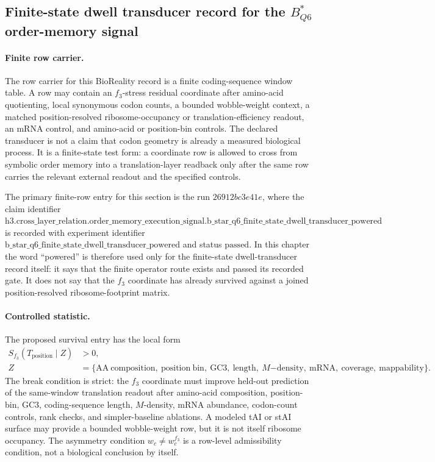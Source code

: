 \subsection{Finite-state dwell transducer record for the $B^*_{Q6}$ order-memory signal}\label{sec:bioreality-bstar-q6-finite-state-dwell-transducer}

\paragraph{Finite row carrier.} The row carrier for this BioReality record is a finite coding-sequence window table. A row may contain an $f_3$-stress residual coordinate after amino-acid quotienting, local synonymous codon counts, a bounded wobble-weight context, a matched position-resolved ribosome-occupancy or translation-efficiency readout, an mRNA control, and amino-acid or position-bin controls. The declared transducer is not a claim that codon geometry is already a measured biological process. It is a finite-state test form: a coordinate row is allowed to cross from symbolic order memory into a translation-layer readback only after the same row carries the relevant external readout and the specified controls.

The primary finite-row entry for this section is the run $26912bc3e41e$, where the claim identifier $\mathrm{h3.cross\_layer\_relation.order\_memory\_execution\_signal.b\_star\_q6\_finite\_state\_dwell\_transducer\_powered}$ is recorded with experiment identifier $\mathrm{b\_star\_q6\_finite\_state\_dwell\_transducer\_powered}$ and status $\mathrm{passed}$. In this chapter the word ``powered'' is therefore used only for the finite-state dwell-transducer record itself: it says that the finite operator route exists and passed its recorded gate. It does not say that the $f_3$ coordinate has already survived against a joined position-resolved ribosome-footprint matrix.

\paragraph{Controlled statistic.} The proposed survival entry has the local form
$$
\begin{aligned}
S_{f_3}(T_{\mathrm{position}}\mid Z) &> 0,\\
Z &= \{\mathrm{AA\ composition},\ \mathrm{position\ bin},\ \mathrm{GC3},\ \mathrm{length},\ M\mathrm{-density},\ \mathrm{mRNA},\ \mathrm{coverage},\ \mathrm{mappability}\}.
\end{aligned}
$$
The break condition is strict: the $f_3$ coordinate must improve held-out prediction of the same-window translation readout after amino-acid composition, position-bin, GC3, coding-sequence length, $M$-density, mRNA abundance, codon-count controls, rank checks, and simpler-baseline ablations. A modeled tAI or stAI surface may provide a bounded wobble-weight row, but it is not itself ribosome occupancy. The asymmetry condition $w_c \neq w_c^{f_3}$ is a row-level admissibility condition, not a biological conclusion by itself.

